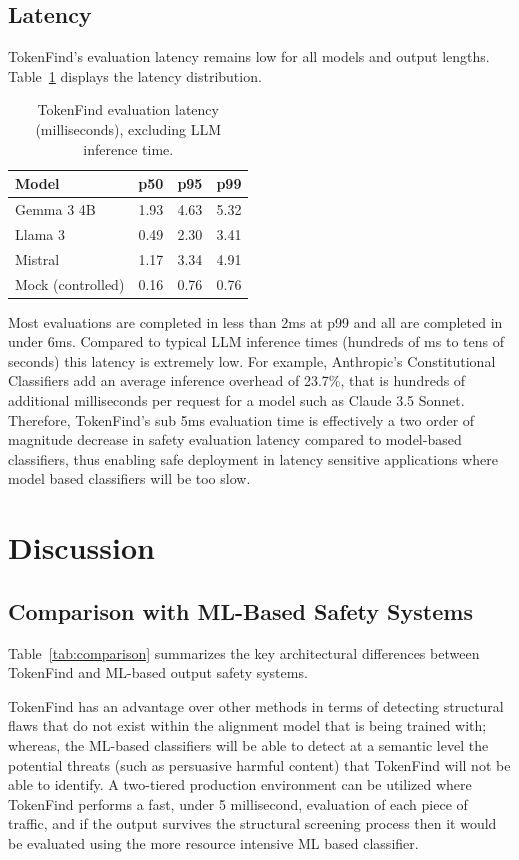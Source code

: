 \documentclass[11pt]{article}
\begin{document}
\subsection{Latency}
\label{sec:latency}

TokenFind's evaluation latency remains low for all models and output lengths. Table~\ref{tab:latency} displays
the latency distribution.

\begin{table}[ht]
\centering
\caption{TokenFind evaluation latency (milliseconds), excluding LLM inference time.}
\label{tab:latency}
\begin{tabular}{lccc}
\toprule
Model & p50 & p95 & p99 \\
\midrule
Gemma 3 4B & 1.93 & 4.63 & 5.32 \\
Llama 3 & 0.49 & 2.30 & 3.41 \\
Mistral & 1.17 & 3.34 & 4.91 \\
Mock (controlled) & 0.16 & 0.76 & 0.76 \\
\bottomrule
\end{tabular}
\end{table}

Most evaluations are completed in less than 2ms at p99 and all are completed in under 6ms.
Compared to typical LLM inference times (hundreds of ms to tens of seconds) this latency is extremely low. For example, Anthropic's Constitutional Classifiers add an average inference overhead
of 23.7\%, that is hundreds of additional milliseconds per request for a model such as Claude 3.5
Sonnet. Therefore, TokenFind's sub 5ms evaluation time is effectively a two order of magnitude
decrease in safety evaluation latency compared to model-based classifiers, thus enabling safe deployment in latency sensitive applications where model based classifiers will be too slow.

\section{Discussion}
\label{sec:discussion}

\subsection{Comparison with ML-Based Safety Systems}
\label{sec:comparison-ml}

Table~\ref{tab:comparison} summarizes the key architectural differences between TokenFind and ML-based output
safety systems.

TokenFind has an advantage over other methods in terms of detecting structural flaws that do
not exist within the alignment model that is being trained with; whereas, the ML-based classifiers
will be able to detect at a semantic level the potential threats (such as persuasive harmful content)
that TokenFind will not be able to identify. A two-tiered production environment can be utilized
where TokenFind performs a fast, under 5 millisecond, evaluation of each piece of traffic, and if the
output survives the structural screening process then it would be evaluated using the more resource
intensive ML based classifier.
\end{document}
